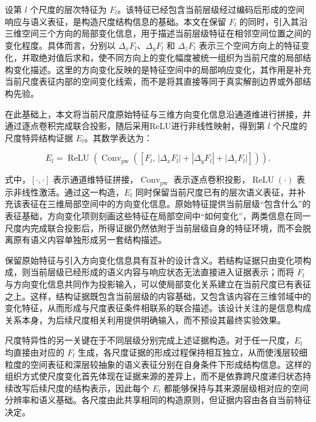 设第 \(l\) 个尺度的层次特征为 \(F_l\)。该特征已经包含当前层级经过编码后形成的空间响应与语义表征，是构造尺度结构信息的基础。本文在保留 \(F_l\) 的同时，引入其沿三维空间三个方向的局部变化信息，用于描述当前层级特征在相邻空间位置之间的变化程度。具体而言，分别以 \(\Delta_x F_l\)、\(\Delta_y F_l\) 和 \(\Delta_z F_l\) 表示三个空间方向上的特征变化，并取绝对值后求和，使不同方向上的变化幅度被统一组织为当前尺度的局部结构变化描述。这里的方向变化反映的是特征空间中的局部响应变化，其作用是补充当前尺度表征内部的空间变化线索，而不是将其直接等同于真实解剖边界或外部结构先验。

在此基础上，本文将当前尺度原始特征与三维方向变化信息沿通道维进行拼接，并通过逐点卷积完成联合投影，随后采用ReLU进行非线性映射，得到第 \(l\) 个尺度的尺度特异结构证据 \(E_l\)。其数学表达为：

\begin{equation}
\label{eq:ch4-scale-specific-evidence}
E_l=\operatorname{ReLU}\!\left(
\operatorname{Conv}_{\mathrm{pw}}\!\left(
\left[
F_l,\,
\left|\Delta_xF_l\right|
+\left|\Delta_yF_l\right|
+\left|\Delta_zF_l\right|
\right]
\right)
\right).
\end{equation}

式中，\([\cdot,\cdot]\) 表示通道维特征拼接，\(\operatorname{Conv}_{\mathrm{pw}}\) 表示逐点卷积投影，\(\operatorname{ReLU}(\cdot)\) 表示非线性激活。通过这一构造，\(E_l\) 同时保留当前尺度已有的层次语义表征，并补充该表征在三维局部空间中的方向变化信息。原始特征提供当前层级“包含什么”的表征基础，方向变化项则刻画这些特征在局部空间中“如何变化”，两类信息在同一尺度内完成联合投影后，所得证据仍然依附于当前层级自身的特征环境，而不会脱离原有语义内容单独形成另一套结构描述。

保留原始特征与引入方向变化信息具有互补的设计含义。若结构证据只由变化项构成，则当前层级已经形成的语义内容与响应状态无法直接进入证据表示；而将 \(F_l\) 与方向变化信息共同作为投影输入，可以使局部变化关系建立在当前尺度已有表征之上。这样，结构证据既包含当前层级的内容基础，又包含该内容在三维邻域中的变化特征，从而形成与尺度表征条件相联系的联合描述。该设计关注的是信息构成关系本身，为后续尺度相关利用提供明确输入，而不预设其最终实验效果。

尺度特异性的另一关键在于不同层级分别完成上述证据构造。对于任一尺度，\(E_l\) 均直接由对应的 \(F_l\) 生成，各尺度证据的形成过程保持相互独立，从而使浅层较细粒度的空间表征和深层较抽象的语义表征分别在自身条件下形成结构信息。这样的组织方式使尺度变化首先体现在证据来源的差异上，而不是依靠跨尺度递归状态持续改写后续尺度的结构表示，因此每个 \(E_l\) 都能够保持与其来源层级相对应的空间分辨率和语义基础。各尺度由此共享相同的构造原则，但证据内容由各自当前特征决定。

